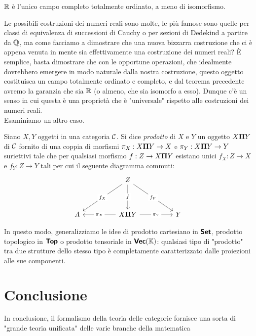 \documentclass{article}
\begin{document}
\begin{theorem}
    $\mathbb{R}$ è l'unico campo completo totalmente ordinato, a meno di isomorfismo.
\end{theorem}

Le possibili costruzioni dei numeri reali sono molte, le più famose sono quelle per classi di equivalenza di successioni di Cauchy o per sezioni di Dedekind a partire da $\mathbb{Q}$, ma come facciamo a dimostrare che una nuova bizzarra costruzione che ci è appena venuta in mente sia effettivamente una costruzione dei numeri reali? È semplice, basta dimostrare che con le opportune operazioni, che idealmente dovrebbero emergere in modo naturale dalla nostra costruzione, questo oggetto costituisca un campo totalmente ordinato e completo, e dal teorema precedente avremo la garanzia che sia $\mathbb{R}$ (o almeno, che sia isomorfo a esso). Dunque c'è un senso in cui questa è una proprietà che è "universale" rispetto alle costruzioni dei numeri reali.\\ Esaminiamo un altro caso.

\begin{definition}
    Siano $X,Y$ oggetti in una categoria $\mathcal{C}$. Si dice \emph{prodotto} di $X$ e $Y$ un oggetto $X \mathbf{\Pi} Y$ di $\mathcal{C}$ fornito di una coppia di morfismi $\pi_X: X \mathbf{\Pi} Y \to X$ e $\pi_Y : X \mathbf{\Pi} Y \to Y$ suriettivi tale che per qualsiasi morfismo $f:Z\to X \mathbf{\Pi} Y$ esistano unici $f_X: Z \to X$ e $f_Y : Z\to Y$ tali per cui il seguente diagramma commuti: 
    \[\begin{tikzcd}
	    && Z \\
	    \\
	    A && {X \cattimes Y} && Y
	    \arrow["f"{description}, from=1-3, to=3-3]
	    \arrow["{\pi_X}"{description}, from=3-3, to=3-1]
	    \arrow["{f_X}"{description}, from=1-3, to=3-1]
	    \arrow["{f_Y}"{description}, from=1-3, to=3-5]
	    \arrow["{\pi_Y}"{description}, from=3-3, to=3-5]
    \end{tikzcd}\]
\end{definition}

In questo modo, generalizziamo le idee di prodotto cartesiano in $\text{\sffamily\textbf{Set}}$, prodotto topologico in $\text{\sffamily\textbf{Top}}$ o prodotto tensoriale in $\text{\sffamily\textbf{Vec}}(\mathbb{K})$: qualsiasi tipo di "prodotto" tra due strutture dello stesso tipo è completamente caratterizzato dalle proiezioni alle sue componenti.

\section{Conclusione}
\label{sec:Ending}

In conclusione, il formalismo della teoria delle categorie fornisce una sorta di "grande teoria unificata" delle varie branche della matematica

\end{document}
